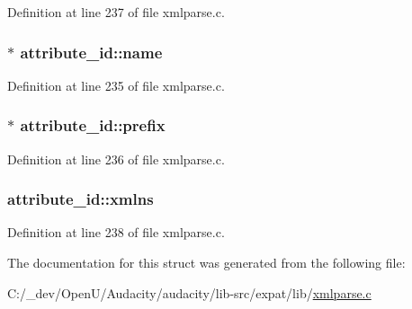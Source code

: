 Definition at line 237 of file xmlparse.\+c.

\subsubsection[{\texorpdfstring{name}{name}}]{$\ast$ attribute\+\_\+id\+::name}\hypertarget{structattribute__id_af8b2fb1a367eada9343d480d68ecbdc2}{}\label{structattribute__id_af8b2fb1a367eada9343d480d68ecbdc2}


Definition at line 235 of file xmlparse.\+c.

\subsubsection[{\texorpdfstring{prefix}{prefix}}]{$\ast$ attribute\+\_\+id\+::prefix}\hypertarget{structattribute__id_afb6bec6f1cdd62a46d587cde524ec8f0}{}\label{structattribute__id_afb6bec6f1cdd62a46d587cde524ec8f0}


Definition at line 236 of file xmlparse.\+c.

\subsubsection[{\texorpdfstring{xmlns}{xmlns}}]{ attribute\+\_\+id\+::xmlns}\hypertarget{structattribute__id_a7fd4c7dcbd21d38a1ab2aa3b510a907d}{}\label{structattribute__id_a7fd4c7dcbd21d38a1ab2aa3b510a907d}


Definition at line 238 of file xmlparse.\+c.



The documentation for this struct was generated from the following file\+:\begin{DoxyCompactItemize}
\item 
C\+:/\+\_\+dev/\+Open\+U/\+Audacity/audacity/lib-\/src/expat/lib/\hyperlink{xmlparse_8c}{xmlparse.\+c}\end{DoxyCompactItemize}
